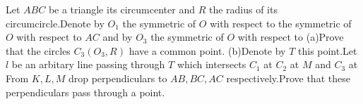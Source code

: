 Let $ABC$ be a triangle its circumcenter and $R$ the radius of its circumcircle.Denote by $O_{1}$ the symmetric of $O$ with respect to  the symmetric of $O$ with respect to $AC$ and by $O_{3}$ the symmetric of $O$ with respect to 
(a)Prove that the circles   $C_{3}(O_{3},R)$ have a common point.
(b)Denote by $T$ this point.Let $l$ be an arbitary line passing through $T$ which intersects $C_{1}$ at  $C_{2}$ at $M$ and $C_{3}$ at From $K,L,M$ drop perpendiculars to $AB,BC,AC$ respectively.Prove that these perpendiculars pass through a point.